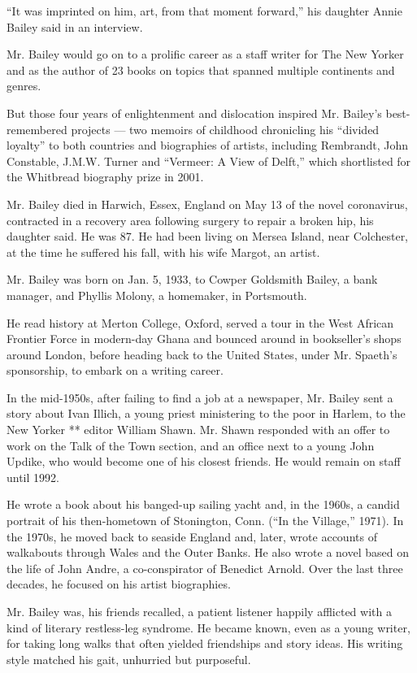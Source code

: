 ``It was imprinted on him, art, from that moment forward,'' his daughter
Annie Bailey said in an interview.

Mr. Bailey would go on to a prolific career as a staff writer for The
New Yorker and as the author of 23 books on topics that spanned multiple
continents and genres.

But those four years of enlightenment and dislocation inspired Mr.
Bailey's best-remembered projects --- two memoirs of childhood
chronicling his ``divided loyalty'' to both countries and biographies of
artists, including Rembrandt, John Constable, J.M.W. Turner and
``Vermeer: A View of Delft,'' which shortlisted for the Whitbread
biography prize in 2001.

Mr. Bailey died in Harwich, Essex, England on May 13 of the novel
coronavirus, contracted in a recovery area following surgery to repair a
broken hip, his daughter said. He was 87. He had been living on Mersea
Island, near Colchester, at the time he suffered his fall, with his wife
Margot, an artist.

Mr. Bailey was born on Jan. 5, 1933, to Cowper Goldsmith Bailey, a bank
manager, and Phyllis Molony, a homemaker, in Portsmouth.

He read history at Merton College, Oxford, served a tour in the West
African Frontier Force in modern-day Ghana and bounced around in
bookseller's shops around London, before heading back to the United
States, under Mr. Spaeth's sponsorship, to embark on a writing career.

In the mid-1950s, after failing to find a job at a newspaper, Mr. Bailey
sent a story about Ivan Illich, a young priest ministering to the poor
in Harlem, to the New Yorker ** editor William Shawn. Mr. Shawn
responded with an offer to work on the Talk of the Town section, and an
office next to a young John Updike, who would become one of his closest
friends. He would remain on staff until 1992.

He wrote a book about his banged-up sailing yacht and, in the 1960s, a
candid portrait of his then-hometown of Stonington, Conn. (``In the
Village,'' 1971). In the 1970s, he moved back to seaside England and,
later, wrote accounts of walkabouts through Wales and the Outer Banks.
He also wrote a novel based on the life of John Andre, a co-conspirator
of Benedict Arnold. Over the last three decades, he focused on his
artist biographies.

Mr. Bailey was, his friends recalled, a patient listener happily
afflicted with a kind of literary restless-leg syndrome. He became
known, even as a young writer, for taking long walks that often yielded
friendships and story ideas. His writing style matched his gait,
unhurried but purposeful.

